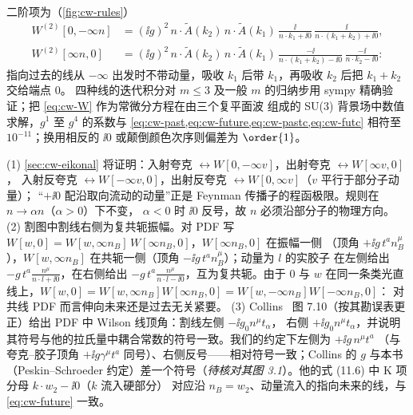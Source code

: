 \begin{remark}[二阶验证与数值检验]\label{rem:cw-second}
二阶项为（\cref{fig:cw-rules}）
\[
\begin{aligned}
W^{(2)}[0,-\infty n]&=(\ii g)^2\,n\cdot\tilde A(k_2)\,n\cdot\tilde A(k_1)\,\frac{\ii}{n\cdot k_1+\ii0}\,\frac{\ii}{n\cdot(k_1+k_2)+\ii0},\\
W^{(2)}[\infty n,0]&=(\ii g)^2\,n\cdot\tilde A(k_2)\,n\cdot\tilde A(k_1)\,\frac{-\ii}{n\cdot(k_1+k_2)-\ii0}\,\frac{-\ii}{n\cdot k_2-\ii0}:
\end{aligned}
\]
指向过去的线从 $-\infty$ 出发时不带动量，吸收 $k_1$ 后带 $k_1$，再吸收 $k_2$ 后把 $k_1+k_2$ 交给端点 $0$。
四种线的迭代积分对 $m\le3$ 及一般 $m$ 的归纳步用 sympy 精确验证；把 \cref{eq:cw-W} 作为常微分方程在由三个复平面波
组成的 SU(3) 背景场中数值求解，$g^1$ 至 $g^4$ 的系数与 \cref{eq:cw-past,eq:cw-future,eq:cw-pastc,eq:cw-futc}
相符至 $10^{-11}$；换用相反的 $\ii0$ 或颠倒颜色次序则偏差为 $\order{1}$。
\end{remark}

\begin{remark}\label{rem:cw-cut}
(1) \cref{sec:cw-eikonal} 将证明：入射夸克 $\leftrightarrow W[0,-\infty v]$，出射夸克 $\leftrightarrow W[\infty v,0]$，
入射反夸克 $\leftrightarrow W[-\infty v,0]$，出射反夸克 $\leftrightarrow W[0,\infty v]$（$v$ 平行于部分子动量）；
“$+\ii0$ 配沿取向流动的动量”正是 Feynman 传播子的程函极限。规则在 $n\to\alpha n$（$\alpha>0$）下不变，
$\alpha<0$ 时 $\ii0$ 反号，故 $n$ 必须沿部分子的物理方向。
(2) 割图中割线右侧为复共轭振幅。对 PDF 写 $W[w,0]=W[w,\infty n_B]\,W[\infty n_B,0]$，$W[\infty n_B,0]$ 在振幅一侧
（顶角 $+\ii g\,t^an_B^\mu$），$W[w,\infty n_B]$ 在共轭一侧（顶角 $-\ii g\,t^an_B^\mu$）；动量为 $l$ 的实胶子
在左侧给出 $-g\,t^a\frac{n^\mu}{n\cdot l+\ii0}$，在右侧给出 $-g\,t^a\frac{n^\mu}{n\cdot l-\ii0}$，互为复共轭。由于 $0$ 与 $w$
在同一条类光直线上，$W[w,0]=W[w,\infty n_B]W[\infty n_B,0]=W[w,-\infty n_B]W[-\infty n_B,0]$：
对共线 PDF 而言伸向未来还是过去无关紧要。
(3) Collins~\cite{Collins2011} 图 7.10（按其勘误表更正）给出 PDF 中 Wilson 线顶角：割线左侧 $-\ii g_0n^\mu t_\alpha$，
右侧 $+\ii g_0n^\mu t_\alpha$，并说明其符号与他的拉氏量中耦合常数的符号一致。我们的约定下左侧为 $+\ii g\,n^\mu t^a$
（与夸克–胶子顶角 $+\ii g\gamma^\mu t^a$ 同号）、右侧反号——相对符号一致；Collins 的 $g$ 与本书（Peskin–Schroeder
约定）差一个符号（\emph{待核对其图 3.1}）。他的式 (11.6) 中 K 项分母 $k\cdot w_2-\ii0$（$k$ 流入硬部分）
对应沿 $n_B=w_2$、动量流入的指向未来的线，与 \cref{eq:cw-future} 一致。
\end{remark}

